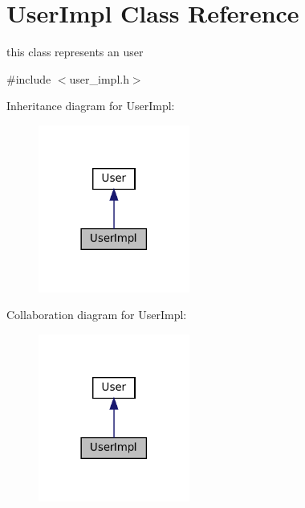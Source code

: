 \hypertarget{classUserImpl}{}\section{User\+Impl Class Reference}
\label{classUserImpl}


this class represents an user  




{\ttfamily \#include $<$user\+\_\+impl.\+h$>$}



Inheritance diagram for User\+Impl\+:\nopagebreak
\begin{figure}[H]
\begin{center}
\leavevmode
\includegraphics[width=141pt]{classUserImpl__inherit__graph}
\end{center}
\end{figure}


Collaboration diagram for User\+Impl\+:\nopagebreak
\begin{figure}[H]
\begin{center}
\leavevmode
\includegraphics[width=141pt]{classUserImpl__coll__graph}
\end{center}
\end{figure}
